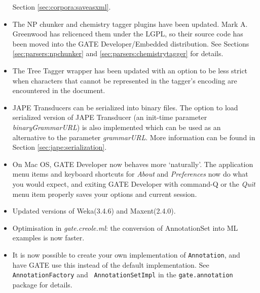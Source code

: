 \begin{itemize}
  Section \ref{sec:corpora:saveasxml}.
\item The NP chunker and chemistry tagger plugins have been updated.  Mark A.
  Greenwood has relicenced them under the LGPL, so their source code has been
  moved into the GATE Developer/Embedded distribution.  See Sections
  \ref{sec:parsers:npchunker} and \ref{sec:parsers:chemistrytagger} for
  details.
\item The Tree Tagger wrapper has been updated with an option to be less strict
  when characters that cannot be represented in the tagger's encoding are
  encountered in the document. 
\item JAPE Transducers can be serialized into binary files.  The option to load
  serialized version of JAPE Transducer (an init-time parameter
  \textit{binaryGrammarURL}) is also implemented which can be used as an
  alternative to the parameter \textit{grammarURL}. More information can be
  found in Section \ref{sec:jape:serialization}.
\item On Mac OS, GATE Developer now behaves more `naturally'.  The application menu items
  and keyboard shortcuts for {\it About} and {\it Preferences} now do
  what you would expect, and exiting GATE Developer with command-Q or the {\it
  Quit} menu item properly saves your options and current session.
\item Updated versions of Weka(3.4.6) and Maxent(2.4.0).
\item Optimisation in {\it gate.creole.ml}: the conversion of AnnotationSet
  into ML examples is now faster.
\item It is now possible to create your own implementation of {\tt Annotation},
  and have GATE use this instead of the default
  implementation.  See {\tt AnnotationFactory} and {\tt
  AnnotationSetImpl} in the {\tt gate.annotation} package for details.
\end{itemize}



